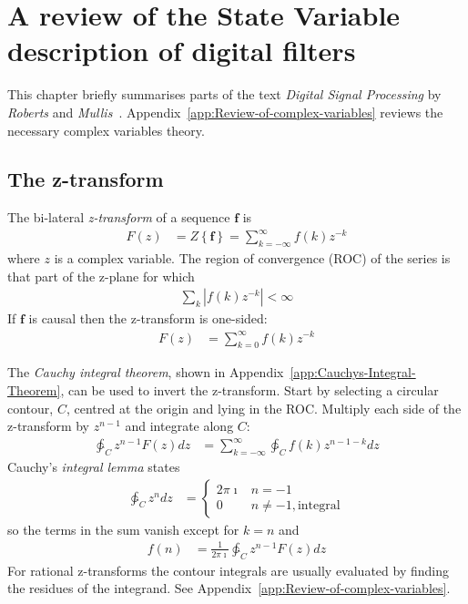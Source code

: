 \documentclass[a4paper,twoside,10pt,english]{report}
\begin{document}
\chapter{\label{chap:Review-State-Variable-digital-filters}A review of the State Variable description of digital filters}
This chapter briefly summarises parts of the text 
\emph{Digital Signal Processing} by \emph{Roberts} and 
\emph{Mullis}~\cite{RobertsMullis_DigitalSignalProcessing}.
Appendix~\ref{app:Review-of-complex-variables} reviews the necessary complex
variables theory.
\section{The z-transform}
The bi-lateral \emph{z-transform} of a sequence $\boldsymbol{f}$ is
\begin{align*}
F\left(z\right) &= Z\left\{\boldsymbol{f}\right\} = 
\sum_{k=-\infty}^{\infty} f\left(k\right)z^{-k}
\end{align*}
where $z$ is a complex variable. The region of convergence (ROC) of the series
is that part of the z-plane for which
\begin{align*}
\sum_{k} \left|f\left(k\right)z^{-k}\right| < \infty
\end{align*}
If $\boldsymbol{f}$ is causal then the z-transform is one-sided:
\begin{align*}
F\left(z\right) &= \sum_{k=0}^{\infty} f\left(k\right)z^{-k}
\end{align*}

The \emph{Cauchy integral theorem}, shown in 
Appendix~\ref{app:Cauchys-Integral-Theorem}, can be used to invert the 
z-transform. Start by selecting a circular contour, $C$, centred at the origin
and lying in the ROC. Multiply each side of the z-transform by $z^{n-1}$ and
integrate along $C$:
\begin{align*}
\ointctrclockwise_{C}z^{n-1}F\left(z\right)dz &= 
\sum_{k=-\infty}^{\infty} \ointctrclockwise_{C}f\left(k\right)z^{n-1-k}dz
\end{align*}
Cauchy's \emph{integral lemma} states
\begin{align*}
\ointctrclockwise_{C}z^{n}dz &=\begin{cases}
2\pi\imath & n=-1 \\
0 & n \ne -1, \text{integral}
\end{cases}
\end{align*}
so the terms in the sum vanish except for $k=n$ and
\begin{align*}
f\left(n\right) &= 
\frac{1}{2\pi\imath}\ointctrclockwise_{C}z^{n-1}F\left(z\right)dz 
\end{align*}
For rational z-transforms the contour integrals are usually evaluated by
finding the residues of the integrand. See 
Appendix~\ref{app:Review-of-complex-variables}.
\end{document}
